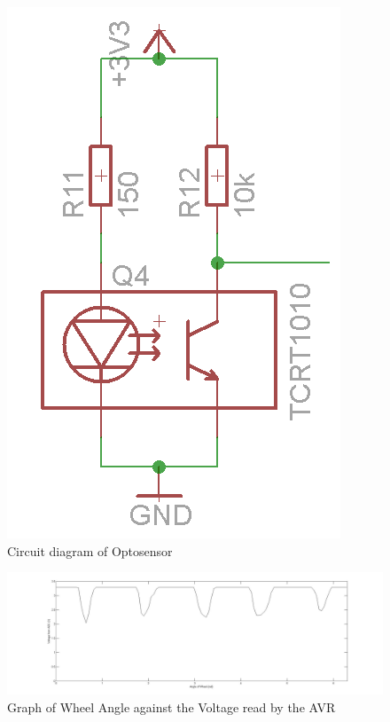 
\begin{figure}
\centering
\includegraphics[scale=0.5]{Figures/TCRT_Circuit.png}
\caption{Circuit diagram of Optosensor}
\label{Circuit:TCRT1010}
\end{figure}

\begin{figure}
\includegraphics[width = \textwidth]{Figures/WheelVoltageGraph.jpg}
\caption{Graph of Wheel Angle against the Voltage read by the AVR}
\label{Graph:WheelVoltage}
\end{figure}


